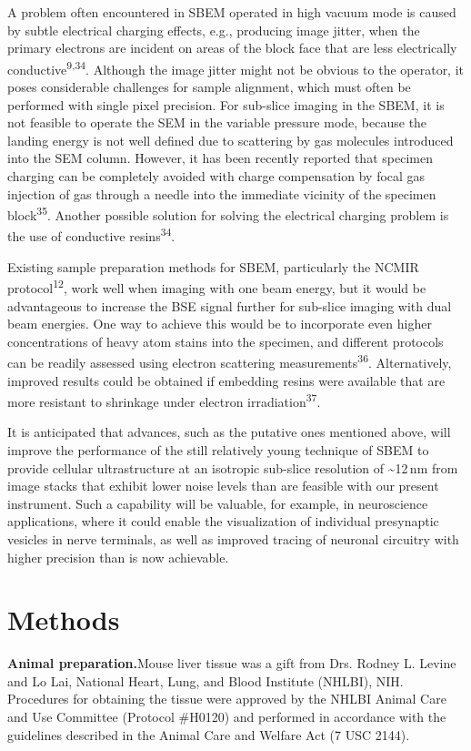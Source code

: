 \documentclass{article}
\newcommand{\cit}[1]{\textsuperscript{#1}}
\begin{document}
A problem often encountered in SBEM operated in high vacuum mode is caused by subtle electrical charging effects, e.g., producing image jitter, when the primary electrons are incident on areas of the block face that are less electrically conductive\cit{9,34}. Although the image jitter might not be obvious to the operator, it poses considerable challenges for sample alignment, which must often be performed with single pixel precision. For sub-slice imaging in the SBEM, it is not feasible to operate the SEM in the variable pressure mode, because the landing energy is not well defined due to scattering by gas molecules introduced into the SEM column. However, it has been recently reported that specimen charging can be completely avoided with charge compensation by focal gas injection of gas through a needle into the immediate vicinity of the specimen block\cit{35}. Another possible solution for solving the electrical charging problem is the use of conductive resins\cit{34}.

Existing sample preparation methods for SBEM, particularly the NCMIR protocol\cit{12}, work well when imaging with one beam energy, but it would be advantageous to increase the BSE signal further for sub-slice imaging with dual beam energies. One way to achieve this would be to incorporate even higher concentrations of heavy atom stains into the specimen, and different protocols can be readily assessed using electron scattering measurements\cit{36}. Alternatively, improved results could be obtained if embedding resins were available that are more resistant to shrinkage under electron irradiation\cit{37}.

It is anticipated that advances, such as the putative ones mentioned above, will improve the performance of the still relatively young technique of SBEM to provide cellular ultrastructure at an isotropic sub-slice resolution of \textasciitilde12\,nm from image stacks that exhibit lower noise levels than are feasible with our present instrument. Such a capability will be valuable, for example, in neuroscience applications, where it could enable the visualization of individual presynaptic vesicles in nerve terminals, as well as improved tracing of neuronal circuitry with higher precision than is now achievable.

\section*{Methods}

\noindent\textbf{Animal preparation.}\quad Mouse liver tissue was a gift from Drs. Rodney L. Levine and Lo Lai, National Heart, Lung, and Blood Institute (NHLBI), NIH. Procedures for obtaining the tissue were approved by the NHLBI Animal Care and Use Committee (Protocol \#H0120) and performed in accordance with the guidelines described in the Animal Care and Welfare Act (7 USC 2144).
\end{document}
